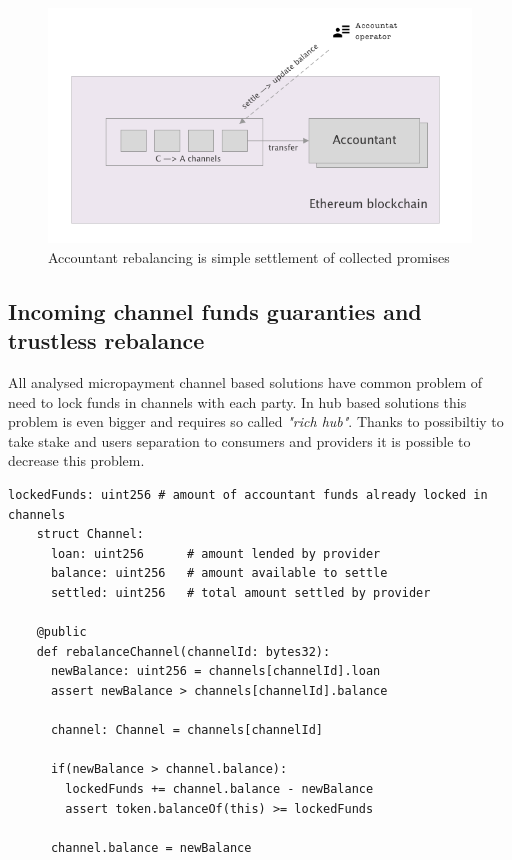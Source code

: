 \documentclass[a4paper,12pt]{article}
\begin{document}
\begin{figure}[H]
    \centering
    \includegraphics[scale=0.5]{img/accountant-rebalance}
    \caption{Accountant rebalancing is simple settlement of collected promises}
    \label{img:accountant-rebalance}
\end{figure}

\subsection{Incoming channel funds guaranties and trustless rebalance}

All analysed micropayment channel based solutions have common problem of need 
to lock funds in channels with each party. In hub based solutions this problem 
is even bigger and requires so called \textit{"rich hub"}. Thanks to possibiltiy 
to take stake and users separation to consumers and providers it is possible to 
decrease this problem.

\begin{lstlisting}[language=Vyper]
    lockedFunds: uint256 # amount of accountant funds already locked in channels
    struct Channel:
      loan: uint256      # amount lended by provider
      balance: uint256   # amount available to settle
      settled: uint256   # total amount settled by provider

    @public
    def rebalanceChannel(channelId: bytes32):
      newBalance: uint256 = channels[channelId].loan
      assert newBalance > channels[channelId].balance

      channel: Channel = channels[channelId]

      if(newBalance > channel.balance):
        lockedFunds += channel.balance - newBalance
        assert token.balanceOf(this) >= lockedFunds

      channel.balance = newBalance
\end{lstlisting}
\end{document}
